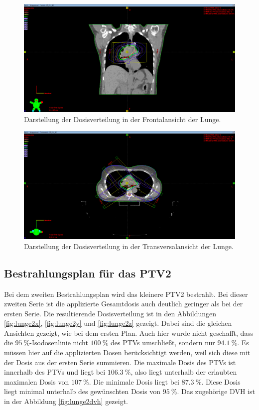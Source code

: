 \begin{figure}[H]
	\centering
	\includegraphics[width=\linewidth]{Bilder/Lunge1_Y}
	\caption{Darstellung der Dosisverteilung in der Frontalansicht  der Lunge.}
	\label{fig:lunge1y}
\end{figure}

\begin{figure}[H]
	\centering
	\includegraphics[width=\linewidth]{Bilder/Lunge1_Z}
	\caption{Darstellung der Dosisverteilung in der Transversalansicht  der Lunge.}
	\label{fig:lunge1z}
\end{figure}

\subsection*{Bestrahlungsplan für das PTV2}
Bei dem zweiten Bestrahlungsplan wird das kleinere PTV2 bestrahlt. Bei dieser zweiten Serie ist die applizierte Gesamtdosis auch deutlich geringer als bei der ersten Serie. Die resultierende Dosisverteilung ist in den Abbildungen \ref{fig:lunge2x}, \ref{fig:lunge2y} und \ref{fig:lunge2z} gezeigt. Dabei sind die gleichen Ansichten gezeigt, wie bei dem ersten Plan.
Auch hier wurde nicht geschafft, dass die $\SI{95}{\percent}$-Isodosenlinie nicht $\SI{100}{\percent}$ des PTVs umschließt, sondern nur $\SI{94,1}{\percent}$. Es müssen hier auf die applizierten Dosen berücksichtigt werden, weil sich diese mit der Dosis aus der ersten Serie summieren. Die maximale Dosis des PTVs ist innerhalb des PTVs und liegt bei $\SI{106.3}{\percent}$, also liegt unterhalb der erlaubten maximalen Dosis von $\SI{107}{\percent}$. Die minimale Dosis liegt bei $\SI{87.3}{\percent}$. Diese Dosis liegt minimal unterhalb des gewünschten Dosis von $\SI{95}{\percent}$.
Das zugehörige DVH ist in der Abbildung \ref{fig:lunge2dvh} gezeigt.

